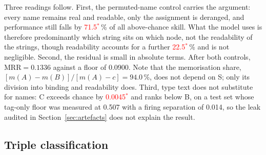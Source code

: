 \documentclass[conference]{IEEEtran}
\newcommand{\pv}[1]{\textcolor{red}{#1\ensuremath{^{\ast}}}}
\begin{document}
Three readings follow. First, the permuted-name control carries the argument:
every name remains real and readable, only the assignment is deranged, and
performance still falls by \pv{71.5}\,\% of all above-chance skill. What the
model uses is therefore predominantly which string sits on which node, not the
readability of the strings, though readability accounts for a further
\pv{22.5}\,\% and is not negligible. Second, the residual is small in absolute
terms. After both controls, $\mathrm{MRR}=0.1336$ against a floor of 0.0900.
Note that the memorisation share, $[m(A)-m(B)]/[m(A)-c] = 94.0$\,\%, does not
depend on S; only its division into binding and readability does. Third, type
text does not substitute for names: C exceeds chance by \pv{0.0045} and ranks
below B, on a test set whose tag-only floor was measured at 0.507 with a
firing separation of 0.014, so the leak audited in Section~\ref{sec:artefacts}
does not explain the result.

\subsection{Triple classification}
\end{document}
